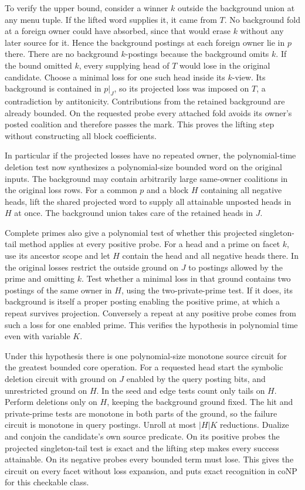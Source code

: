 To verify the upper bound, consider a winner $k$
outside the background union at any menu tuple.
If the lifted word supplies it, it came from $T$.
No background fold at a foreign owner could have
absorbed, since that would erase $k$ without any
later source for it. Hence the background postings
at each foreign owner lie in $p$ there. There are
no background $k$-postings because the background
omits $k$. If the bound omitted $k$, every supplying
head of $T$ would lose in the original candidate.
Choose a minimal loss for one such head inside its
$k$-view. Its background is contained in $p|_J$,
so its projected loss was imposed on $T$, a
contradiction by antitonicity. Contributions from
the retained background are already bounded.
On the requested probe every attached fold avoids
its owner's posted coalition and therefore passes
the mark. This proves the lifting step without
constructing all block coefficients.

In particular if the projected losses have no
repeated owner, the polynomial-time deletion test
now synthesizes a polynomial-size bounded word
on the original inputs. The background may contain
arbitrarily large same-owner coalitions in the
original loss rows. For a common $p$ and a block
$H$ containing all negative heads, lift the shared
projected word to supply all attainable unposted
heads in $H$ at once. The background union takes
care of the retained heads in $J$.

Complete primes also give a polynomial test of whether
this projected singleton-tail method applies at every
positive probe. For a head and a prime on facet $k$,
use its ancestor scope and let $H$ contain the head
and all negative heads there. In the original losses
restrict the outside ground on $J$ to postings allowed
by the prime and omitting $k$. Test whether a minimal
loss in that ground contains two postings of the
same owner in $H$, using the two-private-prime test.
If it does, its background is itself a proper posting
enabling the positive prime, at which a repeat
survives projection. Conversely a repeat at any
positive probe comes from such a loss for one enabled
prime. This verifies the hypothesis in polynomial time
even with variable $K$.

Under this hypothesis there is one polynomial-size
monotone source circuit for the greatest bounded core
operation. For a requested head start the symbolic
deletion circuit with ground on $J$ enabled by the
query posting bits, and unrestricted ground on $H$.
In the seed and edge tests count only tails on $H$.
Perform deletions only on $H$, keeping the background
ground fixed. The hit and private-prime tests are
monotone in both parts of the ground, so the failure
circuit is monotone in query postings. Unroll at most
$|H|K$ reductions. Dualize and conjoin the candidate's
own source predicate. On its positive probes the
projected singleton-tail test is exact and the
lifting step makes every success attainable. On its
negative probes every bounded term must lose.
This gives the circuit on every facet without loss
expansion, and puts exact recognition in coNP for
this checkable class.

